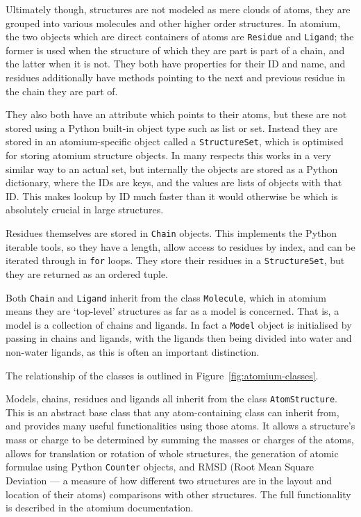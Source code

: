 Ultimately though, structures are not modeled as mere clouds of atoms, they are grouped into various molecules and other higher order structures. In atomium, the two objects which are direct containers of atoms are \texttt{Residue} and \texttt{Ligand}; the former is used when the structure of which they are part is part of a chain, and the latter when it is not. They both have properties for their ID and name, and residues additionally have methods pointing to the next and previous residue in the chain they are part of.

They also both have an attribute which points to their atoms, but these are not stored using a Python built-in object type such as list or set. Instead they are stored in an atomium-specific object called a \texttt{StructureSet}, which is optimised for storing atomium structure objects. In many respects this works in a very similar way to an actual set, but internally the objects are stored as a Python dictionary, where the IDs are keys, and the values are lists of objects with that ID. This makes lookup by ID much faster than it would otherwise be which is absolutely crucial in large structures.

Residues themselves are stored in \texttt{Chain} objects. This implements the Python iterable tools, so they have a length, allow access to residues by index, and can be iterated through in \texttt{for} loops. They store their residues in a \texttt{StructureSet}, but they are returned as an ordered tuple.

Both \texttt{Chain} and \texttt{Ligand} inherit from the class \texttt{Molecule}, which in atomium means they are `top-level' structures as far as a model is concerned. That is, a model is a collection of chains and ligands. In fact a \texttt{Model} object is initialised by passing in chains and ligands, with the ligands then being divided into water and non-water ligands, as this is often an important distinction.

The relationship of the classes is outlined in Figure~\ref{fig:atomium-classes}.

Models, chains, residues and ligands all inherit from the class \texttt{AtomStructure}. This is an abstract base class that any atom-containing class can inherit from, and provides many useful functionalities using those atoms. It allows a structure's mass or charge to be determined by summing the masses or charges of the atoms, allows for translation or rotation of whole structures, the generation of atomic formulae using Python \texttt{Counter} objects, and RMSD (Root Mean Square Deviation --- a measure of how different two structures are in the layout and location of their atoms) comparisons with other structures. The full functionality is described in the atomium documentation.

